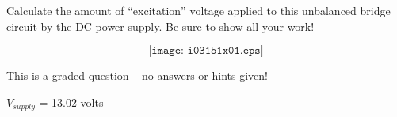 

Calculate the amount of ``excitation'' voltage applied to this unbalanced bridge circuit by the DC power supply.  Be sure to show all your work!

$$\texttt{[image: i03151x01.eps]}$$

\vfil 

\eject






This is a graded question -- no answers or hints given!







$V_{supply}$ = 13.02 volts




